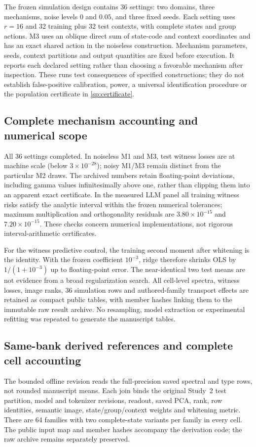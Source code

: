 The frozen simulation design contains 36 settings: two domains, three mechanisms, noise levels $0$ and $0.05$, and three fixed seeds. Each setting uses $r=16$ and 32 training plus 32 test contexts, with complete states and group actions. M3 uses an oblique direct sum of state-code and context coordinates and has an exact shared action in the noiseless construction. Mechanism parameters, seeds, context partitions and output quantities are fixed before execution. It reports each declared setting rather than choosing a favorable mechanism after inspection. These runs test consequences of specified constructions; they do not establish false-positive calibration, power, a universal identification procedure or the population certificate in \cref{sp:certificate}.


\subsection{Complete mechanism accounting and numerical scope}

All 36 settings completed. In noiseless M1 and M3, test witness losses are at machine scale (below $3\times10^{-28}$); noisy M1/M3 remain distinct from the particular M2 draws. The archived numbers retain floating-point deviations, including gamma values infinitesimally above one, rather than clipping them into an apparent exact certificate. In the measured LLM panel all training witness risks satisfy the analytic interval within the frozen numerical tolerances; maximum multiplication and orthogonality residuals are $3.80\times10^{-15}$ and $7.20\times10^{-15}$. These checks concern numerical implementations, not rigorous interval-arithmetic certificates.

For the witness predictive control, the training second moment after whitening is the identity. With the frozen coefficient $10^{-3}$, ridge therefore shrinks OLS by $1/(1+10^{-3})$ up to floating-point error. The near-identical two test means are not evidence from a broad regularization search. All cell-level spectra, witness losses, image ranks, 36 simulation rows and authored-family transport effects are retained as compact public tables, with member hashes linking them to the immutable raw result archive. No resampling, model extraction or experimental refitting was repeated to generate the manuscript tables.


\subsection{Same-bank derived references and complete cell accounting}
\label{app:bounded-risk-details}
The bounded offline revision reads the full-precision saved spectral and type rows, not rounded manuscript means. Each join binds the original Study~2 test partition, model and tokenizer revisions, readout, saved PCA, rank, row identities, semantic image, state/group/context weights and whitening metric. There are 64 families with two complete-state variants per family in every cell. The public input map and member hashes accompany the derivation code; the raw archive remains separately preserved.

